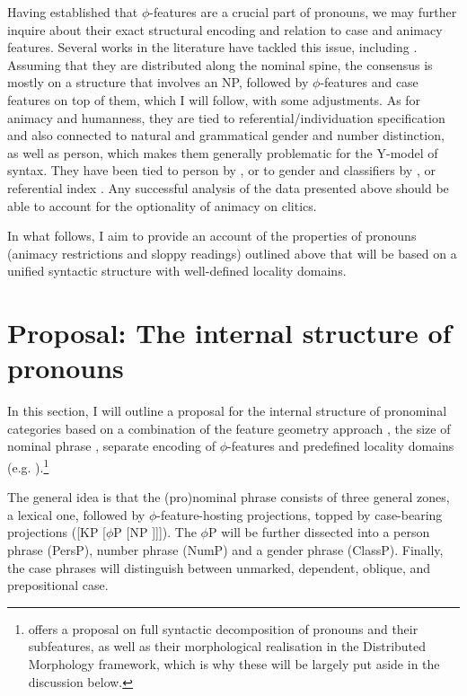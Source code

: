 \documentclass[output=paper,colorlinks,citecolor=brown]{langscibook}
\begin{document}
Having established that $\phi$-features are a crucial part of pronouns, we may further inquire about their exact structural encoding and relation to case and animacy features. Several works in the literature have tackled this issue, including \citet{progovac98,franks13,despic-hybrid,stegovec19,caha21,ruda21pronounstructure}. Assuming that they are distributed along the nominal spine, the consensus is mostly on a structure that involves an NP, followed by $\phi$-features and case features on top of them, which I will follow, with some adjustments. 
As for animacy and humanness, they are tied to referential/individuation specification and also connected to natural and grammatical gender and number distinction, as well as person, which makes them generally problematic for the Y-model of syntax.
They have been tied to person by \citet{sicheltoosarvandani21wccfl,sicheltoosarvandani22}, or to gender and classifiers by \citet{harleyritter02,puskarsyntax,puskarglossapredicate,arsenijevic21}, or referential index \citep{stegovec19}. Any successful analysis of the data presented above should be able to account for the optionality of animacy on clitics.
 	
In what follows, I aim to provide an account of the properties of pronouns (animacy restrictions and sloppy readings) outlined above that will be based on a unified syntactic structure with well-defined locality domains.

\section{Proposal: The internal structure of pronouns}\label{pus:sec:proposal}

In this section, I will outline a proposal for the internal structure of pronominal categories based on a combination of the feature geometry approach \citep{harleyritter02}, the size of nominal phrase \citep{dechainewiltschko,caha21}, separate encoding of $\phi$-features and predefined locality domains (e.g. \citealt{moskal15,vanurkpronouns}).\footnote{\citet{puskargallienpronouns} offers a proposal on full syntactic decomposition of pronouns and their subfeatures, as well as their morphological realisation in the Distributed Morphology framework, which is why these will be largely put aside in the discussion below.} 

The general idea is that the (pro)nominal phrase consists of three general zones, a lexical one, followed by $\phi$-feature-hosting projections, topped by case-bearing projections ([KP [$\phi$P [NP ]]]). The $\phi$P will be further dissected into a person phrase (PersP), number phrase (NumP)  and a gender phrase (ClassP). Finally, the case phrases will distinguish between unmarked, dependent, oblique, and prepositional case. 
\end{document}
